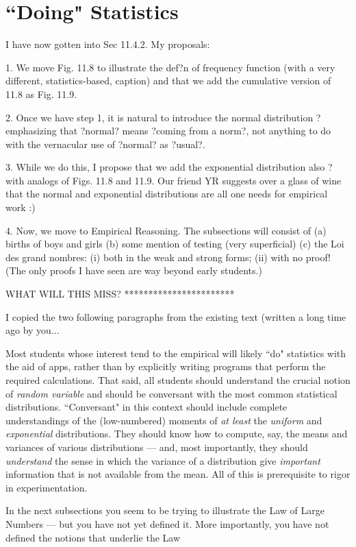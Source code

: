 \section{``Doing" Statistics}
\label{sec:doing-statistics}


I have now gotten into Sec 11.4.2.  My proposals:

1. We move Fig. 11.8 to illustrate the def?n of frequency function (with a very different, statistics-based, caption) and that we add the cumulative version of 11.8 as Fig. 11.9.

2. Once we have step 1, it is natural to introduce the normal distribution ? emphasizing that ?normal? means ?coming from a norm?, not anything to do with the vernacular use of ?normal? as ?usual?.

3. While we do this, I propose that we add the exponential distribution also ? with analogs of Figs. 11.8 and 11.9.  Our friend YR suggests over a glass of wine that the normal and exponential distributions are all one needs for empirical work :)

4. Now, we move to Empirical Reasoning.  The subsections will consist of
(a) births of boys and girls
(b) some mention of testing (very superficial)
(c) the Loi des grand nombres: (i) both in the weak and strong forms; (ii) with no proof!  (The only proofs I have seen are way beyond early students.)

WHAT WILL THIS MISS?
***********************

{\Denis I copied the two following paragraphs from the existing text (written a long time ago by you...}

Most students whose interest tend to the empirical will likely ``do"
statistics with the aid of apps, rather than by explicitly writing
programs that perform the required calculations.  That said, all
students should understand the crucial notion of {\em random variable}
and should be conversant with the most common statistical
distributions.  ``Conversant" in this context should include complete
understandings of the (low-numbered) moments of {\em at least} the
{\em uniform} and {\em exponential} distributions.  They should know
how to compute, say, the means and variances of various distributions
— and, most importantly, they should {\em understand} the sense in
which the variance of a distribution give {\em important} information
that is not available from the mean.  All of this is prerequisite to
rigor in experimentation.

{\Arny In the next subsections you seem to be trying to illustrate the Law of Large Numbers --- but
you have not yet defined it.  More importantly, you have not defined the notions that underlie the
Law}

